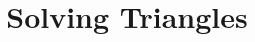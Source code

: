 \documentclass{xourse}
\title{Solving Triangles} %
\begin{document}
\begin{abstract}
\end{abstract}
\maketitle

\end{document}
